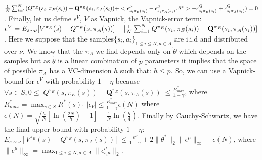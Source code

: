 \documentclass{article}
\newcommand{\Q}{\mathbf{Q}}
\begin{document}
${1\over N}\sum_{i=1}^N(Q^{\pi_E}(s_i,\pi_E(s_i))-\Q^{\pi_E}(s_i,\pi_A(s_i))+<\epsilon^{\mu}_{s_i\pi_E(s_i)}-\epsilon^{\mu}_{s_i\pi_A(s_i)},\theta^*>-\epsilon^{Q}_{s_i\pi_E(s_i)}+\epsilon^{Q}_{s_i\pi_A(s_i)})=0$. Finally, let us define $\epsilon^V$, $V$ as Vapnick, the Vapnick-error term:
$\epsilon^V=E_{s\sim\nu}[V^{\pi_E}(s)-Q^{\pi_E}(s,\pi_A(s))]-[{1\over N}\sum_{i=1}^NQ^{\pi_E}(s_i,\pi_E(s_i))-\Q^{\pi_E}(s_i,\pi_A(s_i))]$. Here we suppose that the samples$\{s_i,a_i\}_{1\leq i \leq N,a\in A}$ are i.i.d and distributed over $\nu$. We know that the $\pi_A$ we find depends only on $\tilde{\theta}$ which depends on the samples
but as $\tilde{\theta}$ is a linear combination of $p$ parameters it implies that the space of possible $\pi_A$ has a VC-dimension $h$ such that: $h\leq p$. So, we can use a Vapnick-bound for $\epsilon^V$ with probability $1-\eta$ because $\forall s\in S, 0\leq|Q^{\pi_E}(s,\pi_E(s))-\Q^{\pi_E}(s,\pi_A(s))|\leq\frac{R^*_{max}}{1-\gamma}$, where $R^*_{max}=\max_{s\in S}R^*(s)$.
$|\epsilon_V|\leq\frac{R^*_{max}}{1-\gamma}\epsilon(N)$ where $\epsilon(N)=\sqrt{\frac{h}{N}[\ln(\frac{2N}{h})+1]-\frac{1}{N}\ln(\frac{\eta}{4})}$. Finally by Cauchy-Schwartz, we have the final upper-bound with probability $1-\eta$:
$E_{s\sim\nu}[V^{\pi_E}(s)-Q^{\pi_E}(s,\pi_A(s))]\leq\frac{\epsilon^R}{1-\gamma}+2\|\theta^*\|_2\|\epsilon^{\mu}\|_{\infty}+\epsilon(N)$, where $\|\epsilon^{\mu}\|_{\infty}=\max_{1\leq i\leq N,a\in A}\|\epsilon^{\mu}_{s_ia}\|_2$.
\end{document}
